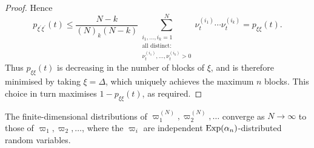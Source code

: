 \begin{proof}
Hence
\begin{equation*}
p_{\xi^\prime\xi^\prime}(t)
    \leq  \frac{N-k}{(N)_k(N-k)} \sum_{\substack{i_1,\dots,i_k =1 
        \\ \text{all distinct:} \\ \nu_t^{(i_1)},\dots,\nu_t^{(i_k)} > 0 }}^N 
        \nu_t^{(i_1)} \cdots \nu_t^{(i_k)} 
    = p_{\xi\xi}(t) .
\end{equation*}
Thus $p_{\xi\xi}(t)$ is decreasing in the number of blocks of $\xi$, and is therefore minimised by taking $\xi = \Delta$, which uniquely achieves the maximum $n$ blocks. This choice in turn maximises $1-p_{\xi\xi}(t)$, as required.
\end{proof}




\begin{lemma}\label{thm:holdingtimes_distn}
The finite-dimensional distributions of $\varpi_1^{(N)} , \varpi_2^{(N)} , \dots$ converge as $N\to\infty$ to those of $\varpi_1, \varpi_2, \dots$, where the $\varpi_i$ are independent $\operatorname{Exp}(\alpha_n)$-distributed random variables.
\end{lemma}

